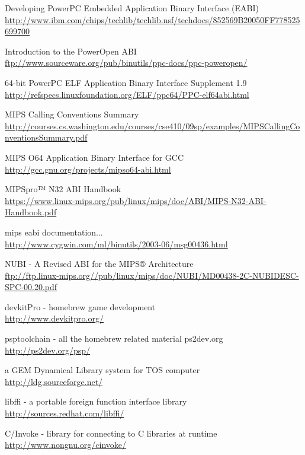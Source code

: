 \begin{thebibliography}{99}
	Developing PowerPC Embedded Application Binary Interface (EABI)\\
	\url{http://www.ibm.com/chips/techlib/techlib.nsf/techdocs/852569B20050FF778525699700}

	Introduction to the PowerOpen ABI\\
	\url{ftp://www.sourceware.org/pub/binutils/ppc-docs/ppc-poweropen/}

	64-bit PowerPC ELF Application Binary Interface Supplement 1.9\\
	\url{http://refspecs.linuxfoundation.org/ELF/ppc64/PPC-elf64abi.html}

	MIPS Calling Conventions Summary\\
	\url{http://courses.cs.washington.edu/courses/cse410/09sp/examples/MIPSCallingConventionsSummary.pdf}

	MIPS O64 Application Binary Interface for GCC\\
	\url{http://gcc.gnu.org/projects/mipso64-abi.html}

	MIPSpro™ N32 ABI Handbook\\
	\url{https://www.linux-mips.org/pub/linux/mips/doc/ABI/MIPS-N32-ABI-Handbook.pdf}

	mips eabi documentation...\\
	\url{http://www.cygwin.com/ml/binutils/2003-06/msg00436.html}

	NUBI - A Revised ABI for the MIPS® Architecture\\
	\url{ftp://ftp.linux-mips.org//pub/linux/mips/doc/NUBI/MD00438-2C-NUBIDESC-SPC-00.20.pdf}

	devkitPro - homebrew game development\\
	\url{http://www.devkitpro.org/}

	psptoolchain - all the homebrew related material ps2dev.org\\
	\url{http://ps2dev.org/psp/}

	a GEM Dynamical Library system for TOS computer\\
	\url{http://ldg.sourceforge.net/}

	libffi - a portable foreign function interface library\\
	\url{http://sources.redhat.com/libffi/}

	C/Invoke - library for connecting to C libraries at runtime\\
	\url{http://www.nongnu.org/cinvoke/}


\end{thebibliography}
